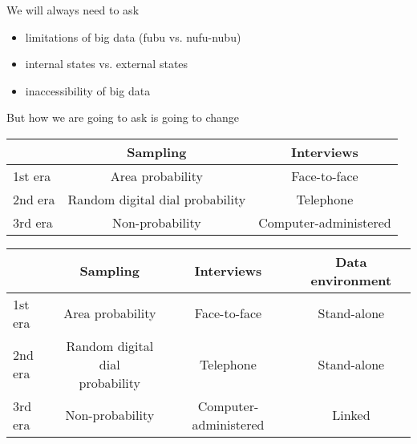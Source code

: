 \documentclass[aspectratio=169]{beamer}
\begin{document}
\begin{frame}

We will always need to ask
\begin{itemize}
\item limitations of big data (fubu vs. nufu-nubu)
\pause
\item internal states vs. external states
\pause
\item inaccessibility of big data
\end{itemize}

\pause
\vfill
But how we are going to ask is going to change
\end{frame}
\begin{frame}

\begin{center}
\begin{tabular}{ l c c}
           & Sampling& Interviews \\
\hline
1st era & Area probability & Face-to-face \\
\pause
2nd era & Random digital dial probability & Telephone \\
\pause
3rd era & \pause Non-probability & Computer-administered  \\
\end{tabular}
\end{center}

\end{frame}
\begin{frame}

\begin{center}
\small{
\begin{tabular}{ l c c c}
           & Sampling & Interviews & Data environment\\
\hline
1st era & Area probability & Face-to-face & Stand-alone \\
2nd era & \parbox[t]{3cm}{\centering Random digital dial\\probability} & Telephone & Stand-alone \\
3rd era & Non-probability & Computer-administered  & Linked \\
\end{tabular}
}
\end{center}

\end{frame}
\end{document}
